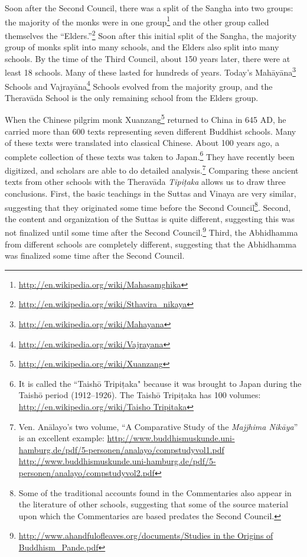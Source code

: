 Soon after the Second Council, there was a split of the Sangha into two groups: the majority of the monks were in one group\footnote{\url{http://en.wikipedia.org/wiki/Mahasamghika}} and the other group called themselves the “Elders.”\footnote{\url{http://en.wikipedia.org/wiki/Sthavira_nikaya}} Soon after this initial split of the Sangha, the majority group of monks split into many schools, and the Elders also split into many schools. By the time of the Third Council, about 150 years later, there were at least 18 schools. Many of these lasted for hundreds of years. Today’s Mahāyāna\footnote{\url{http://en.wikipedia.org/wiki/Mahayana}} Schools and Vajrayāna\footnote{\url{http://en.wikipedia.org/wiki/Vajrayana}} Schools evolved from the majority group, and the Theravāda School is the only remaining school from the Elders group.

When the Chinese pilgrim monk Xuanzang\footnote{\url{http://en.wikipedia.org/wiki/Xuanzang}} returned to China in 645 AD, he carried more than 600 texts representing seven different Buddhist schools. Many of these texts were translated into classical Chinese. About 100 years ago, a complete collection of these texts was taken to Japan.\footnote{It is called the “Taishō Tripiṭaka" because it was brought to Japan during the Taishō period (1912--1926). The Taishō Tripiṭaka has 100 volumes: \url{http://en.wikipedia.org/wiki/Taisho Tripitaka}} They have recently been digitized, and scholars are able to do detailed analysis.\footnote{Ven. Anālayo’s two volume, “A Comparative Study of the \textit{Majjhima Nikāya}” is an excellent example: \newline \url{http://www.buddhismuskunde.uni-hamburg.de/pdf/5-personen/analayo/compstudyvol1.pdf} \newline \url{http://www.buddhismuskunde.uni-hamburg.de/pdf/5-personen/analayo/compstudyvol2.pdf}} Comparing these ancient texts from other schools with the Theravāda \textit{Tipiṭaka} allows us to draw three conclusions. First, the basic teachings in the Suttas and Vinaya are very similar, suggesting that they originated some time before the Second Council\footnote{Some of the traditional accounts found in the Commentaries also appear in the literature of other schools, suggesting that some of the source material upon which the Commentaries are based predates the Second Council.}. Second, the content and organization of the Suttas is quite different, suggesting this was not finalized until some time after the Second Council.\footnote{\url{http://www.ahandfulofleaves.org/documents/Studies in the Origins of Buddhism_Pande.pdf}} Third, the Abhidhamma from different schools are completely different, suggesting that the Abhidhamma was finalized some time after the Second Council.

